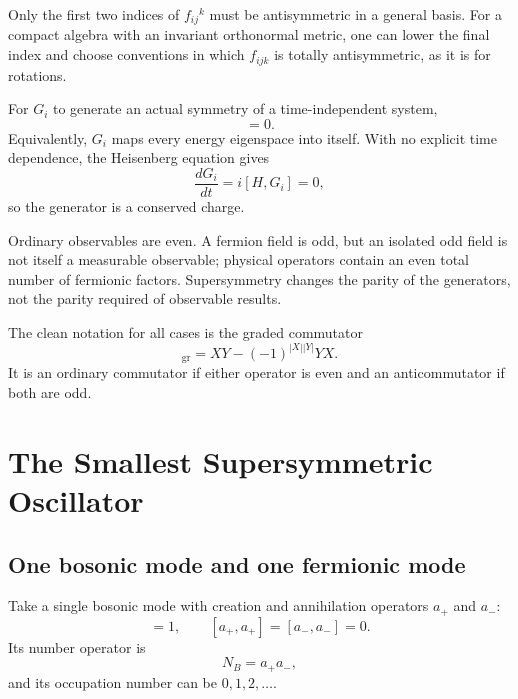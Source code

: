 Only the first two indices of \(f_{ij}{}^k\) must be antisymmetric in a general basis. For a compact algebra with an invariant orthonormal metric, one can lower the final index and choose conventions in which \(f_{ijk}\) is totally antisymmetric, as it is for rotations. 

For \(G_i\) to generate an actual symmetry of a time-independent system,
\begin{equation}
[H,G_i]=0.
\end{equation}
Equivalently, \(G_i\) maps every energy eigenspace into itself. With no explicit time dependence, the Heisenberg equation gives
\begin{equation}
\frac{dG_i}{dt}=i[H,G_i]=0,
\end{equation}
so the generator is a conserved charge.

Ordinary observables are even. A fermion field is odd, but an isolated odd field is not itself a measurable observable; physical operators contain an even total number of fermionic factors. Supersymmetry changes the parity of the generators, not the parity required of observable results.

The clean notation for all cases is the graded commutator
\begin{equation}
[X,Y]_{\mathrm{gr}}
=XY-(-1)^{|X||Y|}YX.
\end{equation}
It is an ordinary commutator if either operator is even and an anticommutator if both are odd.

\section{The Smallest Supersymmetric Oscillator}

\subsection{One bosonic mode and one fermionic mode}

Take a single bosonic mode with creation and annihilation operators \(a_+\) and \(a_-\):
\begin{equation}
[a_-,a_+]=1,
\qquad
[a_+,a_+]=[a_-,a_-]=0.
\end{equation}
Its number operator is
\begin{equation}
N_B=a_+a_-,
\end{equation}
and its occupation number can be \(0,1,2,\ldots\).

